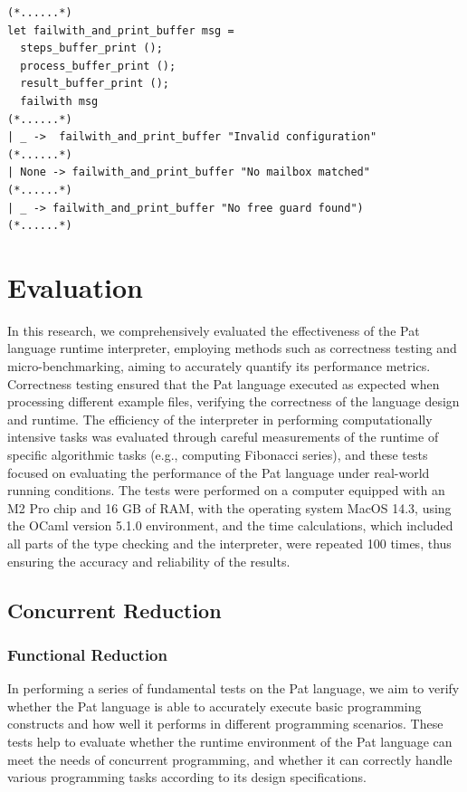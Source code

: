 \documentclass{l4proj}
\begin{document}
\noindent\begin{minipage}{\linewidth}
\lstset{style=Ocamlstyle}
\begin{lstlisting}[caption={Integrating Step Printing with Runtime Error Diagnosis.}, label={lst:error}]
(*......*)
let failwith_and_print_buffer msg =
  steps_buffer_print (); 
  process_buffer_print ();
  result_buffer_print ();
  failwith msg
(*......*)
| _ ->  failwith_and_print_buffer "Invalid configuration"
(*......*)
| None -> failwith_and_print_buffer "No mailbox matched"
(*......*)
| _ -> failwith_and_print_buffer "No free guard found")
(*......*)
\end{lstlisting}
\end{minipage}


\chapter{Evaluation} 
In this research, we comprehensively evaluated the effectiveness of the Pat language runtime interpreter, employing methods such as correctness testing and micro-benchmarking, aiming to accurately quantify its performance metrics. Correctness testing ensured that the Pat language executed as expected when processing different example files, verifying the correctness of the language design and runtime. The efficiency of the interpreter in performing computationally intensive tasks was evaluated through careful measurements of the runtime of specific algorithmic tasks (e.g., computing Fibonacci series), and these tests focused on evaluating the performance of the Pat language under real-world running conditions. The tests were performed on a computer equipped with an M2 Pro chip and 16 GB of RAM, with the operating system MacOS 14.3, using the OCaml version 5.1.0 environment, and the time calculations, which included all parts of the type checking and the interpreter, were repeated 100 times, thus ensuring the accuracy and reliability of the results.

\section{Concurrent Reduction}

\subsection{Functional Reduction}
In performing a series of fundamental tests on the Pat language, we aim to verify whether the Pat language is able to accurately execute basic programming constructs and how well it performs in different programming scenarios. These tests help to evaluate whether the runtime environment of the Pat language can meet the needs of concurrent programming, and whether it can correctly handle various programming tasks according to its design specifications.
\end{document}

